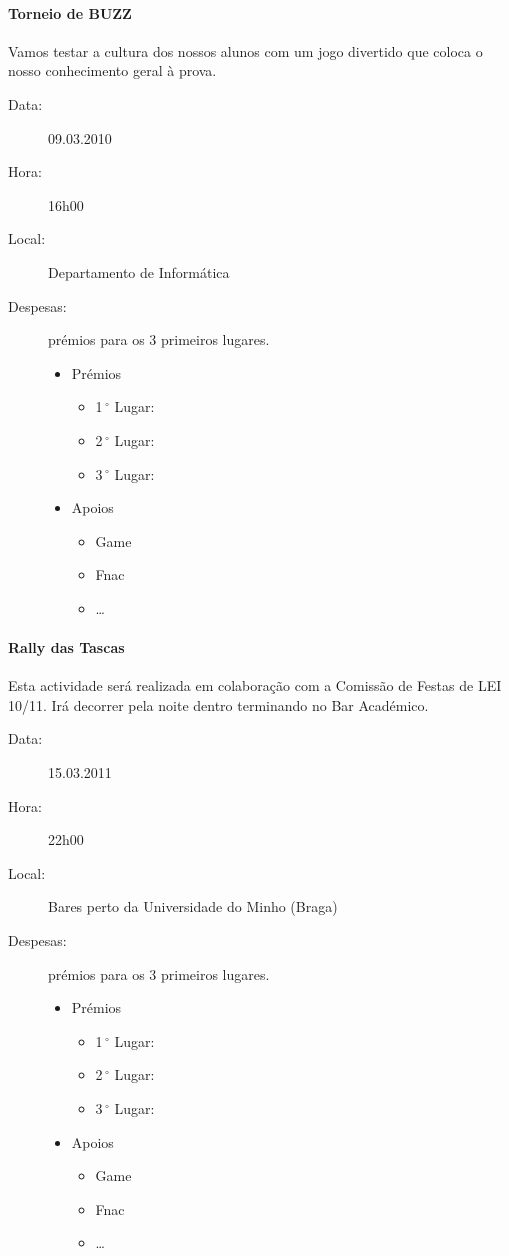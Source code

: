 \paragraph{Torneio de BUZZ}
Vamos testar a cultura dos nossos alunos com um jogo divertido que coloca o nosso conhecimento geral à prova.
\begin{description}
\item[Data:] 09.03.2010
\item[Hora:] 16h00
\item[Local:] Departamento de Informática
\item[Despesas:] prémios para os 3 primeiros lugares.
\begin{itemize}
\item Prémios
\begin{itemize}
\item 1$\,^{\circ}$ Lugar:
\item 2$\,^{\circ}$ Lugar:
\item 3$\,^{\circ}$ Lugar:
\end{itemize}
\item Apoios
\begin{itemize}
\item Game
\item Fnac
\item \dots  
\end{itemize}
\end{itemize}
\end{description}
%
\paragraph{Rally das Tascas}
Esta actividade será realizada em colaboração com a Comissão de Festas de LEI 10/11. Irá decorrer pela noite dentro terminando no Bar Académico.
\begin{description}
\item[Data:] 15.03.2011
\item[Hora:] 22h00
\item[Local:] Bares perto da Universidade do Minho (Braga)
\item[Despesas:] prémios para os 3 primeiros lugares.
\begin{itemize}
\item Prémios
\begin{itemize}
\item 1$\,^{\circ}$ Lugar:
\item 2$\,^{\circ}$ Lugar:
\item 3$\,^{\circ}$ Lugar:
\end{itemize}
\item Apoios
\begin{itemize}
\item Game %
\item Fnac %
\item \dots  
\end{itemize}
\end{itemize}
\end{description}
